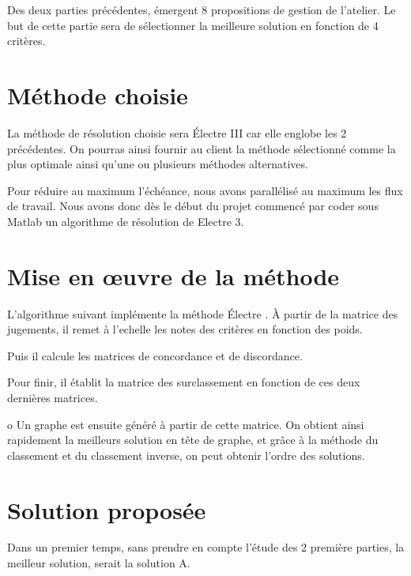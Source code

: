 
Des deux parties précédentes, émergent 8 propositions de gestion de l'atelier.
Le but de cette partie sera de sélectionner la meilleure solution en fonction de 4 critères.

\section{Méthode choisie}

La méthode de résolution choisie sera Électre III car elle englobe les 2 précédentes.
On pourras ainsi fournir au client la méthode sélectionné comme la plus optimale ainsi qu'une ou plusieurs méthodes alternatives.

Pour réduire au maximum l'échéance, nous avons parallélisé au maximum les flux de travail.
Nous avons donc dès le début du projet commencé par coder sous Matlab un algorithme de résolution de Electre 3.

\section{Mise en œuvre de la méthode}
L'algorithme suivant implémente la méthode Électre . À partir de la matrice des jugements, il remet à l'echelle les notes des critères en fonction des poids.


Puis il calcule les matrices de concordance et de discordance.



Pour finir, il établit la matrice des surclassement en fonction de ces deux dernières matrices.

o
Un graphe est ensuite généré à partir de cette matrice.
On obtient ainsi rapidement la meilleurs solution en tête de graphe, et grâce à la méthode du classement et du classement inverse, on peut obtenir l'ordre des solutions.

\section{Solution proposée}

Dans un premier temps, sans prendre en compte l'étude des 2 première parties, la meilleur solution, serait la solution A.

